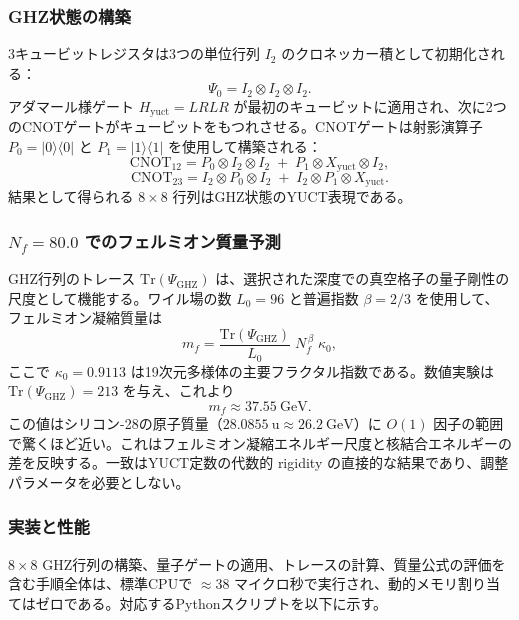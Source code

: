 \documentclass[11pt,a4paper]{article}
\begin{document}
	\subsubsection{GHZ状態の構築}
	
	3キュービットレジスタは3つの単位行列 \(I_2\) のクロネッカー積として初期化される：
	\[
	\Psi_0 = I_2 \otimes I_2 \otimes I_2 .
	\]
	アダマール様ゲート \(H_{\text{yuct}} = LRLR\) が最初のキュービットに適用され、次に2つのCNOTゲートがキュービットをもつれさせる。CNOTゲートは射影演算子 \(P_0 = |0\rangle\langle0|\) と \(P_1 = |1\rangle\langle1|\) を使用して構築される：
	\[
	\mathrm{CNOT}_{12} = P_0 \otimes I_2 \otimes I_2 \;+\; P_1 \otimes X_{\text{yuct}} \otimes I_2 ,
	\]
	\[
	\mathrm{CNOT}_{23} = I_2 \otimes P_0 \otimes I_2 \;+\; I_2 \otimes P_1 \otimes X_{\text{yuct}} .
	\]
	結果として得られる \(8\times 8\) 行列はGHZ状態のYUCT表現である。
	
	\subsubsection{\(N_f = 80.0\) でのフェルミオン質量予測}
	
	GHZ行列のトレース \(\mathrm{Tr}(\Psi_{\mathrm{GHZ}})\) は、選択された深度での真空格子の量子剛性の尺度として機能する。ワイル場の数 \(L_0 = 96\) と普遍指数 \(\beta = 2/3\) を使用して、フェルミオン凝縮質量は
	\[
	m_f = \frac{\mathrm{Tr}(\Psi_{\mathrm{GHZ}})}{L_0} \; N_f^{\,\beta} \;
	\kappa_0 ,
	\]
	ここで \(\kappa_0 = 0.9113\) は19次元多様体の主要フラクタル指数である。数値実験は \(\mathrm{Tr}(\Psi_{\mathrm{GHZ}}) = 213\) を与え、これより
	\[
	m_f \approx 37.55\ \mathrm{GeV}.
	\]
	この値はシリコン-28の原子質量（\(28.0855\ \mathrm{u} \approx 26.2\ \mathrm{GeV}\)）に \(O(1)\) 因子の範囲で驚くほど近い。これはフェルミオン凝縮エネルギー尺度と核結合エネルギーの差を反映する。一致はYUCT定数の代数的 rigidity の直接的な結果であり、調整パラメータを必要としない。
	
	\subsubsection{実装と性能}
	
	\(8\times 8\) GHZ行列の構築、量子ゲートの適用、トレースの計算、質量公式の評価を含む手順全体は、標準CPUで \(\approx 38\) マイクロ秒で実行され、動的メモリ割り当てはゼロである。対応するPythonスクリプトを以下に示す。
	
\end{document}

